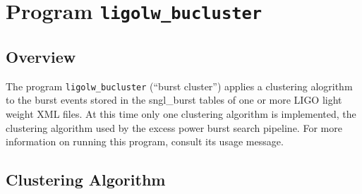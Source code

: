 \documentclass[10pt]{article}
\newcommand{\prog}[1]{\texttt{#1}}
\begin{document}
 
\section{Program \prog{ligolw\_bucluster}}


\subsection{Overview}


The program \prog{ligolw\_bucluster} (``burst cluster'') applies a
clustering alogrithm to the burst events stored in the sngl\_burst tables
of one or more LIGO light weight XML files.  At this time only one
clustering algorithm is implemented, the clustering algorithm used by the
excess power burst search pipeline.  For more information on running this
program, consult its usage message.


\subsection{Clustering Algorithm}
\end{document}
